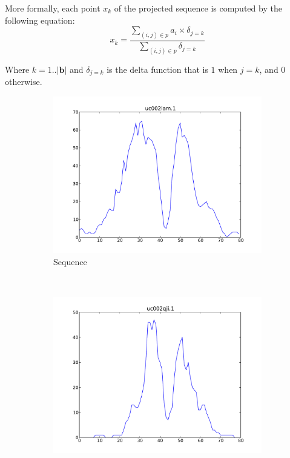\documentclass[parskip]{cs4rep}
\begin{document}
More formally, each point $x_k$ of the projected sequence is computed by the following equation:
\begin{equation}
    x_k =  \frac{\sum_{(i,j) \in p} a_i \times \delta_{j=k}}{\sum_{(i,j) \in p} \delta_{j=k}} 
\end{equation}

Where $k=1..|\mathbf{b}|$ and $\delta_{j=k}$ is the delta function that is $1$ when $j=k$, and $0$ otherwise.

\begin{figure}[t,b]
   \centering
   \begin{subfigure}[b]{0.31\textwidth}
       \centering
       \includegraphics[width=\textwidth]{figures/DTW/sequence.pdf}
       \caption{Sequence}
       \label{fig:DTW:projection:sequence}
   \end{subfigure}
   ~
   \begin{subfigure}[b]{0.31\textwidth}
       \centering
       \includegraphics[width=\textwidth]{figures/DTW/basis.pdf}

\end{subfigure}
\end{figure}
\end{document}
